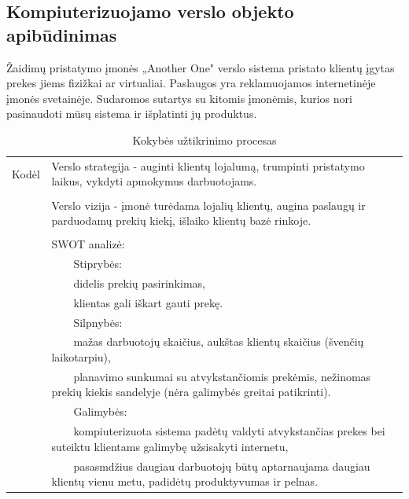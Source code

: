 \documentclass{VUMIFPSkursinis}
\newcommand{\tabitem}{~~\llap{\textbullet}~~}
\newcommand{\tabitemd}{~~\llap{\textopenbullet}~~}
\begin{document}
\subsection{Kompiuterizuojamo verslo objekto apibūdinimas}
Žaidimų pristatymo įmonės „Another One" verslo sistema pristato klientų įgytas prekes jiems fizižkai ar virtualiai. Paslaugos yra reklamuojamos internetinėje įmonės svetainėje. Sudaromos sutartys su kitomis įmonėmis, kurios nori pasinaudoti mūsų sistema ir išplatinti jų produktus.
\begin{center}
\begin{table}[ht]
\centering
	\caption{Kokybės užtikrinimo procesas}
	\begin{tabular}{| p{0.1\linewidth} | p{0.9\linewidth }|} 
	\hline
	Kodėl  & Verslo strategija - auginti klientų lojalumą, trumpinti pristatymo laikus, vykdyti apmokymus darbuotojams.\\ 
		&\\
		& Verslo vizija - įmonė turėdama lojalių klientų, augina paslaugų ir parduodamų prekių kiekį, išlaiko klientų bazė rinkoje. \\
		&\\
		& SWOT analizė: \\
		&\hspace{4mm}\tabitem Stiprybės: \\ 
		&\hspace{8mm}\tabitemd didelis prekių pasirinkimas, \\
		&\hspace{8mm}\tabitemd klientas gali iškart gauti prekę. \\
		&\hspace{4mm}\tabitem Silpnybės: \\
		&\hspace{8mm}\tabitemd mažas darbuotojų skaičius, aukštas klientų skaičius (švenčių laikotarpiu), \\
		&\hspace{8mm}\tabitemd planavimo sunkumai su atvykstančiomis prekėmis, nežinomas prekių kiekis sandelyje (nėra galimybės greitai patikrinti). \\
		&\hspace{4mm}\tabitem Galimybės: \\
		&\hspace{8mm}\tabitemd kompiuterizuota sistema padėtų valdyti atvykstančias prekes bei suteiktu klientams galimybę užsisakyti internetu, \\
		&\hspace{8mm}\tabitemd pasasmdžius daugiau darbuotojų būtų aptarnaujama daugiau klientų vienu metu, padidėtų produktyvumas ir pelnas. \\

\end{tabular}
\end{table}
\end{center}
\end{document}

